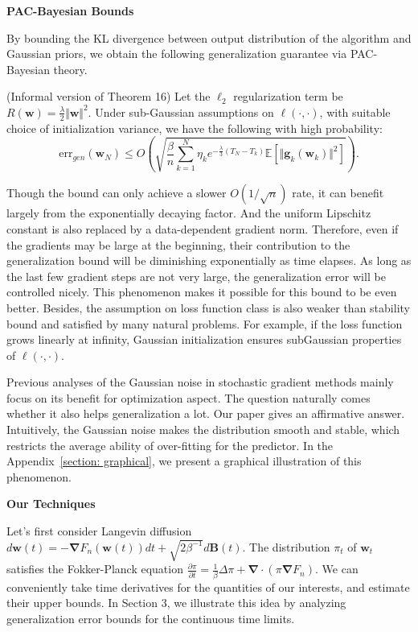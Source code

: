 \documentclass[final,12pt]{colt2018} %
\newcommand{\w}{\bm{w}}
\begin{document}
\noindent \textbf{PAC-Bayesian Bounds}

By bounding the KL divergence between output distribution of the algorithm and Gaussian priors, we obtain the following generalization guarantee via PAC-Bayesian theory.
\begin{theorem}\label{pac-bayes-informal}(Informal version of Theorem 16)
  Let the $\ell_2$ regularization term be $R(\w)=\frac{\lambda}{2}\Vert \w\Vert^2$. Under sub-Gaussian assumptions on $\ell(\cdot,\cdot)$, with suitable choice of initialization variance, we have the following with high probability:
  \begin{equation}
      \mathrm{err}_{gen}(\bm{w}_{N})\leq O\left(\sqrt{\frac{\beta}{n}\sum_{k=1}^{N} \eta_k e^{-\frac{\lambda}{3}(T_N-T_k)}\mathbb{E}\left[\Vert\bm{g}_k(\bm{w}_k)\Vert^2\right]}\right).
  \end{equation}
\end{theorem}
Though the bound can only achieve a slower $O(1/\sqrt{n})$ rate, it can benefit largely from the exponentially decaying factor. And the uniform Lipschitz constant is also replaced by a data-dependent gradient norm. Therefore, even if the gradients may be large at the beginning, their contribution to the generalization bound will be diminishing exponentially as time elapses. As long as the last few gradient steps are not very large, the generalization error will be controlled nicely. This phenomenon makes it possible for this bound to be even better. Besides, the assumption on loss function class is also weaker than stability bound and satisfied by many natural problems. For example, if the loss function grows linearly at infinity, Gaussian initialization ensures subGaussian properties of $\ell(\cdot,\cdot)$.

Previous analyses of the Gaussian noise in stochastic gradient methods mainly focus on its benefit for optimization aspect. The question naturally comes whether it also helps generalization a lot. Our paper gives an affirmative answer. Intuitively, the Gaussian noise makes the distribution smooth and stable, which restricts the average ability of over-fitting for the predictor. In the Appendix~\ref{section: graphical}, we present a graphical illustration of this phenomenon.

 \vspace{0.1cm}
\noindent \textbf{Our Techniques}

Let's first consider Langevin diffusion $d\bm{w}(t)=-\bm{\nabla} F_n(\bm{w}(t))dt+\sqrt{2 \beta^{-1}}d\bm{B}(t)$. The distribution $\pi_t$ of $\w_t$ satisfies the Fokker-Planck equation $\frac{\partial \pi}{\partial t}=\frac{1}{\beta}\Delta \pi+\bm{\nabla}\cdot(\pi\bm{\nabla} F_n)$. We can conveniently take time derivatives for the quantities of our interests, and estimate their upper bounds. In Section 3, we illustrate this idea by analyzing generalization error bounds for the continuous time limits.
\end{document}
